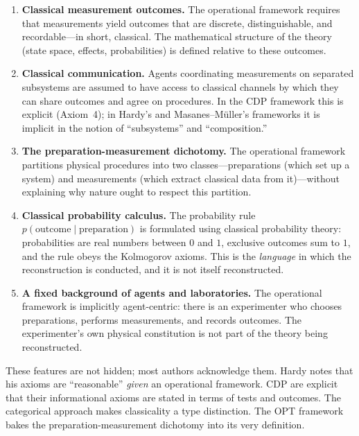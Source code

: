 \documentclass[pdflatex,sn-mathphys-num]{sn-jnl}%
\begin{document}
\begin{enumerate}
\item \textbf{Classical measurement outcomes.} The operational framework requires that measurements yield outcomes that are discrete, distinguishable, and recordable---in short, classical. The mathematical structure of the theory (state space, effects, probabilities) is defined relative to these outcomes.

\item \textbf{Classical communication.} Agents coordinating measurements on separated subsystems are assumed to have access to classical channels by which they can share outcomes and agree on procedures. In the CDP framework this is explicit (Axiom~4); in Hardy's and Masanes--M\"{u}ller's frameworks it is implicit in the notion of ``subsystems'' and ``composition.''

\item \textbf{The preparation-measurement dichotomy.} The operational framework partitions physical procedures into two classes---preparations (which set up a system) and measurements (which extract classical data from it)---without explaining why nature ought to respect this partition.

\item \textbf{Classical probability calculus.} The probability rule $p(\text{outcome} \mid \text{preparation})$ is formulated using classical probability theory: probabilities are real numbers between $0$ and $1$, exclusive outcomes sum to $1$, and the rule obeys the Kolmogorov axioms. This is the \emph{language} in which the reconstruction is conducted, and it is not itself reconstructed.

\item \textbf{A fixed background of agents and laboratories.} The operational framework is implicitly agent-centric: there is an experimenter who chooses preparations, performs measurements, and records outcomes. The experimenter's own physical constitution is not part of the theory being reconstructed.
\end{enumerate}

These features are not hidden; most authors acknowledge them. Hardy \cite{Hardy2001} notes that his axioms are ``reasonable'' \emph{given} an operational framework. CDP \cite{Chiribella2011} are explicit that their informational axioms are stated in terms of tests and outcomes. The categorical approach makes classicality a type distinction. The OPT framework bakes the preparation-measurement dichotomy into its very definition.
\end{document}
